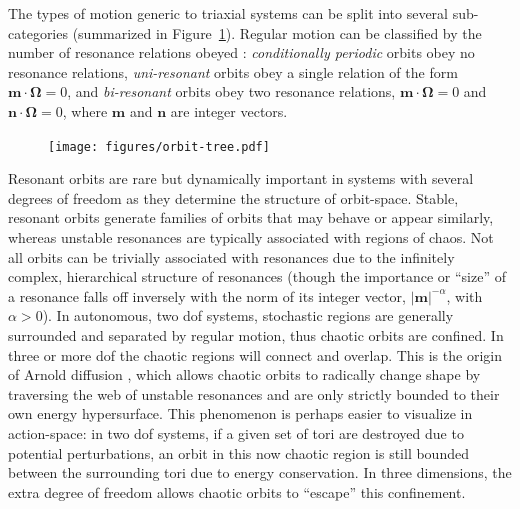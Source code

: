 \documentclass[letterpaper,12pt,preprint]{aastex}
\newcommand{\bs}[1]{\boldsymbol{#1}}
\begin{document}
The types of motion generic to triaxial systems can be split into several sub-categories (summarized in Figure~\ref{fig:orbit-tree}). Regular motion can be classified by the number of resonance relations obeyed \citep[e.g.,][]{lichtenberg83, valluri98}: \emph{conditionally periodic} orbits obey no resonance relations, \emph{uni-resonant} orbits obey a single relation of the form $\bs{m}\cdot\bs{\Omega}=0$, and \emph{bi-resonant} orbits obey two resonance relations, $\bs{m}\cdot\bs{\Omega}=0$ and $\bs{n}\cdot\bs{\Omega}=0$, where $\bs{m}$ and $\bs{n}$ are integer vectors.

\begin{figure}[!h]
\begin{center}
\texttt{[image: figures/orbit-tree.pdf]}
\caption{} \label{fig:orbit-tree}
\end{center}
\end{figure}

Resonant orbits are rare \citep{merritt99} but dynamically important in systems with several degrees of freedom as they determine the structure of orbit-space. Stable, resonant orbits generate families of orbits that may behave or appear similarly, whereas unstable resonances are typically associated with regions of chaos. Not all orbits can be trivially associated with resonances due to the infinitely complex, hierarchical structure of resonances (though the importance or ``size'' of a resonance falls off inversely with the norm of its integer vector, $|\bs{m}|^{-\alpha}$, with $\alpha > 0$). In autonomous, two dof systems, stochastic regions are generally surrounded and separated by regular motion, thus chaotic orbits are confined. In three or more dof the chaotic regions will connect and overlap. This is the origin of Arnold diffusion \citep{arnold64}, which allows chaotic orbits to radically change shape by traversing the web of unstable resonances and are only strictly bounded to their own energy hypersurface. This phenomenon is perhaps easier to visualize in action-space: in two dof systems, if a given set of tori are destroyed due to potential perturbations, an orbit in this now chaotic region is still bounded between the surrounding tori due to energy conservation. In three dimensions, the extra degree of freedom allows chaotic orbits to ``escape'' this confinement.
\end{document}
